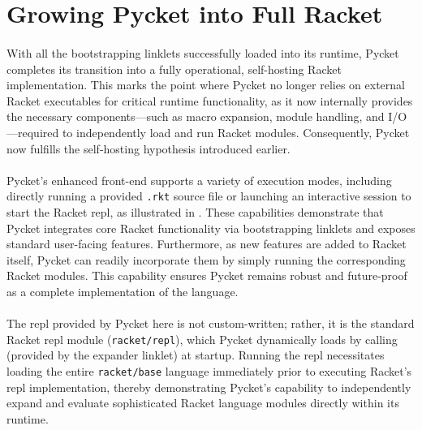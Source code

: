 	\section[\texorpdfstring{Growing Pycket into Full Racket}{Pycket as Full Racket}]{Growing Pycket into Full Racket}


		\paragraph{}%
			With all the bootstrapping linklets successfully loaded into its runtime, Pycket completes its transition into a fully operational, self-hosting Racket implementation. This marks the point where Pycket no longer relies on external Racket executables for critical runtime functionality, as it now internally provides the necessary components—such as macro expansion, module handling, and I/O—required to independently load and run Racket modules. Consequently, Pycket now fulfills the self-hosting hypothesis introduced earlier.

		\paragraph{}%
			Pycket's enhanced front-end supports a variety of execution modes, including directly running a provided \texttt{.rkt} source file or launching an interactive session to start the Racket \gls{repl}, as illustrated in . These capabilities demonstrate that Pycket integrates core Racket functionality via bootstrapping linklets and exposes standard user-facing features. Furthermore, as new features are added to Racket itself, Pycket can readily incorporate them by simply running the corresponding Racket modules. This capability ensures Pycket remains robust and future-proof as a complete implementation of the language.

		\paragraph{}%
			The \gls{repl} provided by Pycket here is not custom-written; rather, it is the standard Racket \gls{repl} module (\texttt{racket/repl}), which Pycket dynamically loads by calling  (provided by the expander linklet) at startup. Running the \gls{repl} necessitates loading the entire \texttt{racket/base} language immediately prior to executing Racket’s \gls{repl} implementation, thereby demonstrating Pycket's capability to independently expand and evaluate sophisticated Racket language modules directly within its runtime.

